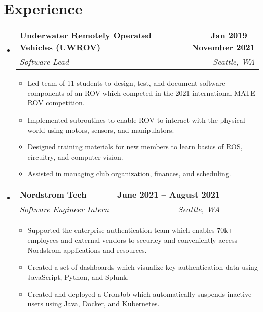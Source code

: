 \documentclass[letterpaper,11pt]{article}
\makeatletter
\newcommand{\resumeItem}[1]{
  \item\small{
    {#1 \vspace{-2pt}}
  }
}
\newcommand{\resumeSubheading}[4]{
  \vspace{-2pt}\item
    \begin{tabular*}{1.0\textwidth}[t]{l@{\extracolsep{\fill}}r}
      \textbf{#1} & \textbf{\small #2} \\
      \textit{\small#3} & \textit{\small #4} \\
    \end{tabular*}\vspace{-7pt}
}
\newcommand{\resumeSubHeadingListStart}{\begin{itemize}[leftmargin=0.0in, label={}]}
\newcommand{\resumeSubHeadingListEnd}{\end{itemize}}
\newcommand{\resumeItemListStart}{\begin{itemize}}
\newcommand{\resumeItemListEnd}{\end{itemize}\vspace{-5pt}}
\makeatother
\begin{document}
\section{Experience}
  \resumeSubHeadingListStart
    \resumeSubheading
    {Underwater Remotely Operated Vehicles (UWROV)}{Jan 2019 -- November 2021}
    {Software Lead}{Seattle, WA}
    \resumeItemListStart
      \resumeItem{Led team of 11 students to design, test, and document software components
                  of an ROV which competed in the 2021 international MATE ROV competition.}
      \resumeItem{Implemented subroutines to enable ROV to interact with the physical
                  world using motors, sensors, and manipulators.}
      \resumeItem{Designed training materials for new members to learn basics of ROS,
                  circuitry, and computer vision.}
      \resumeItem{Assisted in managing club organization, finances, and scheduling.}
    \resumeItemListEnd

    \resumeSubheading
      {Nordstrom Tech}{June 2021 -- August 2021}
      {Software Engineer Intern}{Seattle, WA}
      \resumeItemListStart
        \resumeItem{Supported the enterprise authentication team which enables 70k+ employees
                    and external vendors to securley and conveniently access Nordstrom applications and resources.}
        \resumeItem{Created a set of dashboards which visualize key authentication data using JavaScript, Python, and Splunk.}
        \resumeItem{Created and deployed a CronJob which automatically suspends inactive users using Java, Docker, and Kubernetes.}
      \resumeItemListEnd
  \resumeSubHeadingListEnd
\vspace{-16pt}

\end{document}
